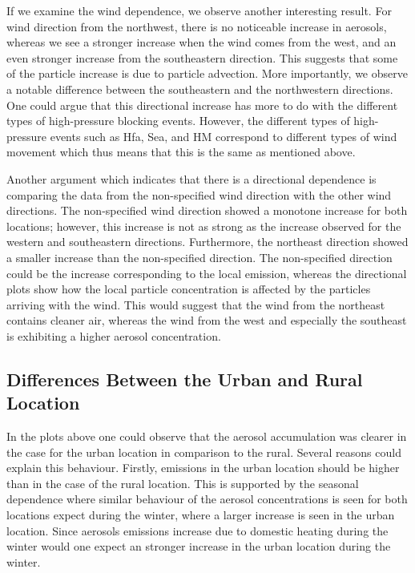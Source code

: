 If we examine the wind dependence, we observe another interesting result. For wind direction from the northwest, there is no noticeable increase in aerosols, whereas we see a stronger increase when the wind comes from the west, and an even stronger increase from the southeastern direction. This suggests that some of the particle increase is due to particle advection. More importantly, we observe a notable difference between the southeastern and the northwestern directions. One could argue that this directional increase has more to do with the different types of high-pressure blocking events. However, the different types of high-pressure events such as Hfa, Sea, and HM correspond to different types of wind movement which thus means that this is the same as mentioned above. 

Another argument which indicates that there is a directional dependence is comparing the data from the non-specified wind direction with the other wind directions. The non-specified wind direction showed a monotone increase for both locations; however, this increase is not as strong as the increase observed for the western and southeastern directions. Furthermore, the northeast direction showed a smaller increase than the non-specified direction. The non-specified direction could be the increase corresponding to the local emission, whereas the directional plots show how the local particle concentration is affected by the particles arriving with the wind. This would suggest that the wind from the northeast contains cleaner air, whereas the wind from the west and especially the southeast is exhibiting a higher aerosol concentration. 

\subsection{Differences Between the Urban and Rural Location}
In the plots above one could observe that the aerosol accumulation was clearer in the case for the urban location in comparison to the rural. Several reasons could explain this behaviour. Firstly, emissions in the urban location  should be higher than in the case of the rural location. This is supported by the seasonal dependence where similar behaviour of the aerosol concentrations is seen for both locations expect during the winter, where a larger increase is seen in the urban location. Since aerosols emissions increase due to domestic heating during the winter would one expect an stronger increase in the urban location during the winter. 

